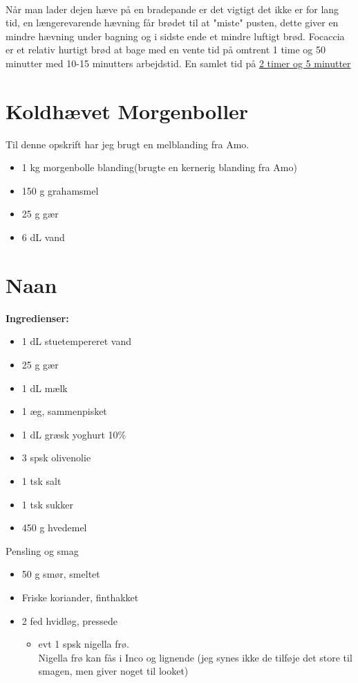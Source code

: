 \documentclass{book}
\begin{document}
\\ Når man lader dejen hæve på en bradepande er det vigtigt det ikke er for lang tid, en længerevarende hævning får brødet til at "miste" pusten, dette giver en mindre hævning under bagning og i sidste ende et mindre luftigt brød. 
Focaccia er et relativ hurtigt brød at bage med en vente tid på omtrent 1 time og 50 minutter med 10-15 minutters arbejdstid. En samlet tid på \underline{2 timer og 5 minutter}
\newpage {}
\newpage \section{Koldhævet Morgenboller}
Til denne opskrift har jeg brugt en melblanding fra Amo. 
\begin{minipage}[t]{0.5\textwidth}
\begin{itemize}
    \item 1 kg morgenbolle blanding(brugte en kernerig blanding fra Amo)
    \item 150 g grahamsmel
    \item 25 g gær
    \item 6 dL vand
\end{itemize}
\end{minipage}
\begin{minipage}[t]{0.5\textwidth}
\end{minipage}
\newpage \section{Naan}
\begin{minipage}[t]{0.5\textwidth}
\textbf{Ingredienser:}
\begin{itemize}
    \item 1 dL stuetempereret vand
    \item 25 g gær
    \item 1 dL mælk
    \item 1 æg, sammenpisket
    \item 1 dL græsk yoghurt 10\%
    \item 3 spsk olivenolie
    \item1 tsk salt
    \item1 tsk sukker
    \item450 g hvedemel
\end{itemize}
    Pensling og smag
\begin{itemize}
    \item 50 g smør, smeltet
    \item Friske koriander, finthakket
    \item 2 fed hvidløg, pressede
    \begin{itemize}
        \item  evt 1 spsk nigella frø. \\
        Nigella frø kan fås i Inco og lignende (jeg synes ikke de tilføje det store til smagen, men giver noget til looket)
        \end{itemize}
\end{itemize}
\end{minipage}
\end{document}
